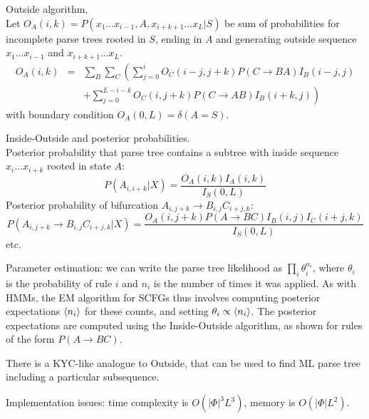 \documentclass{beamer}
\begin{document}
\begin{frame}{}
\itemb
\item Outside algorithm. \\
Let $O_A(i,k) = P(x_1 \ldots x_{i-1},A,x_{i+k+1} \ldots x_L|S)$
be sum of probabilities for incomplete parse trees rooted in $S$, ending in $A$ and generating outside sequence $x_1 \ldots x_{i-1}$ and $x_{i+k+1} \ldots x_L$.
\begin{eqnarray*}
O_A(i,k) & = & \sum_B \sum_C \left(
\sum_{j=0}^i O_C(i-j,j+k) P(C \to BA) I_B(i-j,j) \right. \\ & & \left. +
\sum_{j=0}^{L-i-k} O_C(i,j+k) P(C \to AB) I_B(i+k,j)
\right)
\end{eqnarray*}
with boundary condition $O_A(0,L) = \delta(A=S)$.
\iteme
\end{frame}
\begin{frame}{}
\itemb
\item Inside-Outside and posterior probabilities. \\
Posterior probability that parse tree contains a subtree with inside sequence $x_i \ldots x_{i+k}$ rooted in state $A$:
\[
P(A_{i,i+k}|X) = \frac{O_A(i,k) I_A(i,k)}{I_S(0,L)}
\]
Posterior probability of bifurcation $A_{i,j+k} \to B_{i,j} C_{i+j,k}$:
\small
\[
P(A_{i,j+k} \to B_{i,j} C_{i+j,k}|X) = \frac{O_A(i,j+k) P(A \to BC) I_B(i,j) I_C(i+j,k)}{I_S(0,L)}
\]
\normalsize
etc.
\iteme
\end{frame}
\begin{frame}{}
\itemb
\item Parameter estimation: we can write the parse tree likelihood as $\prod_i \theta_i^{n_i}$,
where $\theta_i$ is the probability of rule $i$ and $n_i$ is the number of times it was applied.
As with HMMs, the EM algorithm for SCFGs thus involves computing posterior expectations $\langle n_i \rangle$ for these counts,
and setting $\theta_i \propto \langle n_i \rangle$.
The posterior expectations are computed using the Inside-Outside algorithm, as shown for rules of the form $P(A \to BC)$.
\item There is a KYC-like analogue to Outside, that can be used to find ML parse tree including a particular subsequence.
\item Implementation issues: time complexity is $O(|\Phi|^3 L^3)$, memory is $O(|\Phi| L^2)$.
\iteme

\end{frame}
\end{document}
